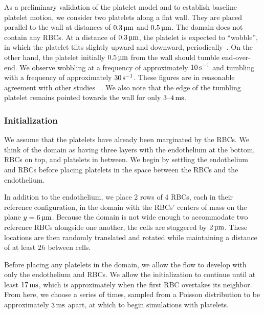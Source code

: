 As a preliminary validation of the platelet model and to establish baseline platelet
motion, we consider two platelets along a flat wall. They are placed parallel to the wall
at distances of $0.3\um$ and $0.5\um$. The domain does not contain any RBCs. At a
distance of $0.3\um$, the platelet is expected to ``wobble'', in which the platelet tilts
slightly upward and downward, periodically~\cite{King:2005fv}. On the other hand, the
platelet initially $0.5\um$ from the wall should tumble end-over-end. We observe wobbling
at a frequency of approximately $10\persec$ and tumbling with a frequency of
approximately $30\persec$. These figures are in reasonable agreement with other studies~%
\cite{King:2005fv}. We also note that the edge of the tumbling platelet remains pointed
towards the wall for only 3--$4\ms$.

\subsubsection{Initialization}\label{sec:blood-init}

We assume that the platelets have already been marginated by the RBCs. We think of the
domain as having three layers with the endothelium at the bottom, RBCs on top, and
platelets in between. We begin by settling the endothelium and RBCs before placing
platelets in the space between the RBCs and the endothelium.

In addition to the endothelium, we place 2 rows of 4 RBCs, each in their reference
configuration, in the domain with the RBCs' centers of mass on the plane $y=6\um$.
Because the domain is not wide enough to accommodate two reference RBCs alongside one
another, the cells are staggered by $2\um$. These locations are then randomly translated
and rotated while maintaining a distance of at least $2h$ between cells.

Before placing any platelets in the domain, we allow the flow to develop with only the
endothelium and RBCs. We allow the initialization to continue until at least $17\ms$,
which is approximately when the first RBC overtakes its neighbor. From here, we choose a
series of times, sampled from a Poisson distribution to be approximately $3\ms$ apart, at
which to begin simulations with platelets.

